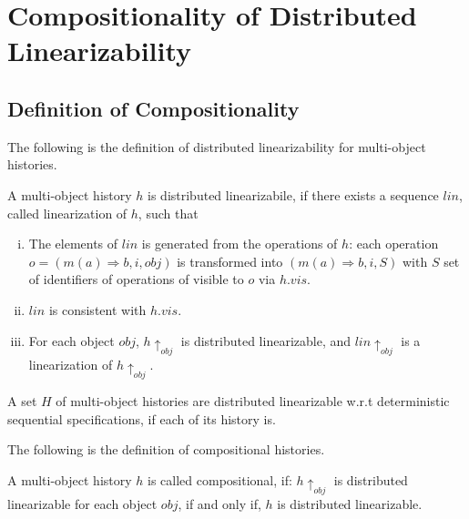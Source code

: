 
\section{Compositionality of Distributed Linearizability}
\label{sec:compositionality of distributed linearizability}




\subsection{Definition of Compositionality}
\label{subsec:definition of compositionality}

The following is the definition of distributed linearizability for multi-object histories.

\begin{definition}
\label{definition:distributed linearizability for multi-object histories}
A multi-object history $h$ is distributed linearizabile, if there exists a sequence $\mathit{lin}$, called linearization of $h$, such that

\begin{enumerate}[(i)]
\item The elements of $\mathit{lin}$ is generated from the operations of $h$: each operation $o = (m(a) \Rightarrow b,i,\mathit{obj})$ is transformed into $(m(a) \Rightarrow b,i,S)$ with $S$ set of identifiers of operations of visible to $o$ via $h.\mathit{vis}$.
\item $\mathit{lin}$ is consistent with $h. \mathit{vis}$.
\item For each object $\mathit{obj}$, $h \uparrow_{\mathit{obj}}$ is distributed linearizable, and $\mathit{lin} \uparrow_{ \mathit{obj} }$ is a linearization of $h \uparrow_{\mathit{obj}}$.
\end{enumerate}

A set $H$ of multi-object histories are distributed linearizable w.r.t deterministic sequential specifications, if each of its history is.
\end{definition}

The following is the definition of compositional histories.

\begin{definition}[Compositionality]
\label{definition:compositionality}
A multi-object history $h$ is called compositional, if: $h \uparrow_{\mathit{obj}}$ is distributed linearizable for each object $\mathit{obj}$, if and only if, $h$ is distributed linearizable.
\end{definition}

